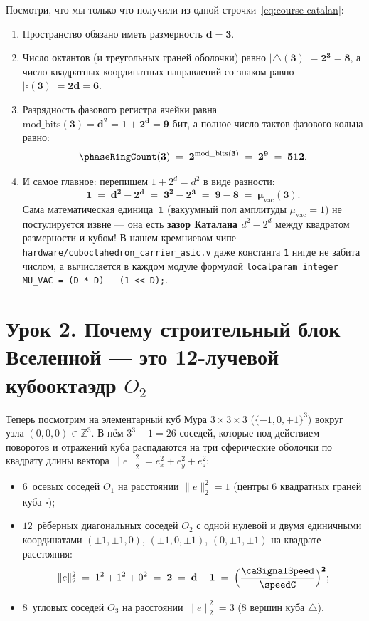 Посмотри, что мы только что получили из одной строчки~\eqref{eq:course-catalan}:
\begin{enumerate}[label=\textbf{\arabic*.},noitemsep]
\item Пространство обязано иметь размерность $\mathbf{d = 3}$.
\item Число октантов (и треугольных граней оболочки) равно $\mathbf{|{\triangle}(3)| = 2^3 = 8}$, а число квадратных координатных направлений со знаком равно $\mathbf{|\square(3)| = 2d = 6}$.
\item Разрядность фазового регистра ячейки равна $\mathbf{\mathrm{mod\_bits}(3) = d^2 = 1 + 2^d = 9\text{ бит}}$, а полное число тактов фазового кольца равно:
  \[
    \mathbf{\phaseRingCount(3) \;=\; 2^{\mathrm{mod\_bits}(3)} \;=\; 2^9 \;=\; 512}.
  \]
\item И самое главное: перепишем $1 + 2^d = d^2$ в виде разности:
  \begin{equation}
    \label{eq:course-unit-catalan}
    \mathbf{1 \;=\; d^2 - 2^d \;=\; 3^2 - 2^3 \;=\; 9 - 8 \;=\; \mu_{\mathrm{vac}}(3)}.
  \end{equation}
  Сама математическая единица~$\mathbf{1}$ (вакуумный пол амплитуды $\mu_{\mathrm{vac}}=1$) не постулируется извне --- она есть \textbf{зазор Каталана $d^2 - 2^d$} между квадратом размерности и кубом! В нашем кремниевом чипе \texttt{hardware/cuboctahedron\_carrier\_asic.v} даже константа \texttt{1} нигде не забита числом, а вычисляется в каждом модуле формулой \texttt{localparam integer MU\_VAC = (D * D) - (1 << D);}.
\end{enumerate}

\section{Урок 2. Почему строительный блок Вселенной --- это 12-лучевой кубооктаэдр \texorpdfstring{$O_2$}{O2}}

Теперь посмотрим на элементарный куб Мура $3\times 3\times 3$ ($\{-1,0,+1\}^3$) вокруг узла $(0,0,0)\in\mathbb{Z}^3$. В нём $3^3 - 1 = 26$ соседей, которые под действием поворотов и отражений куба распадаются на три сферические оболочки по квадрату длины вектора $\|e\|_2^2 = e_x^2 + e_y^2 + e_z^2$:
\begin{itemize}[noitemsep]
\item $6$~осевых соседей $O_1$ на расстоянии $\|e\|_2^2 = 1$ (центры $6$ квадратных граней куба $\square$);
\item $12$~рёберных диагональных соседей $O_2$ с одной нулевой и двумя единичными координатами $(\pm 1,\pm 1,0)$, $(\pm 1,0,\pm 1)$, $(0,\pm 1,\pm 1)$ на квадрате расстояния:
  \[
    \|e\|_2^2 \;=\; 1^2 + 1^2 + 0^2 \;=\; \mathbf{2 \;=\; d - 1 \;=\; \Bigl(\frac{\caSignalSpeed}{\speedC}\Bigr)^2};
  \]
\item $8$~угловых соседей $O_3$ на расстоянии $\|e\|_2^2 = 3$ ($8$ вершин куба $\triangle$).
\end{itemize}

